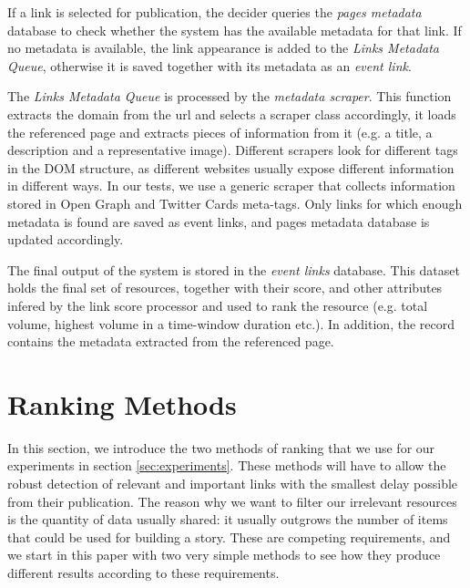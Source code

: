 \documentclass{sig-alternate}
\begin{document}
If a link is selected for publication, the decider queries the \emph{pages metadata} database to check whether the system has the available metadata for that link. If no metadata is available, the link appearance is added to the \emph{Links Metadata Queue}, otherwise it is saved together with its metadata as an \emph{event link}.

The \emph{Links Metadata Queue} is processed by the \emph{metadata scraper}. This function extracts the domain from the url and selects a scraper class accordingly, it loads the referenced page and extracts pieces of information from it (e.g. a title, a description and a representative image). Different scrapers look for different tags in the DOM structure, as different websites usually expose different information in different ways. In our tests, we use a generic scraper that collects information stored in Open Graph and Twitter Cards meta-tags. Only links for which enough metadata is found are saved as event links, and pages metadata database is updated accordingly. %

The final output of the system is stored in the \emph{event links} database. This dataset holds the final set of resources, together with their score, and other attributes infered by the link score processor and used to rank the resource (e.g. total volume, highest volume in a time-window duration etc.). In addition, the record contains the metadata extracted from the referenced page. %

\section{Ranking Methods}
\label{sec:ranking_methods}
In this section, we introduce the two methods of ranking that we use for our experiments in section \ref{sec:experiments}. These methods will have to allow the robust detection of relevant and important links with the smallest delay possible from their publication. The reason why we want to filter our irrelevant resources is the quantity of data usually shared: it usually outgrows the number of items that could be used for building a story. These are competing requirements, and we start in this paper with two very simple methods to see how they produce different results according to these requirements.
\end{document}
